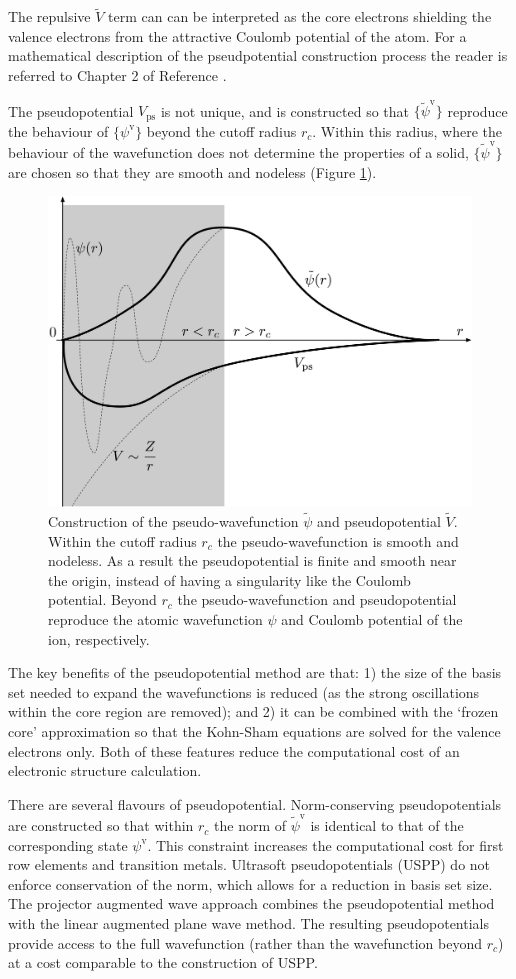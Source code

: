 The repulsive $\tilde{V}$ term can can be interpreted as the core electrons shielding the valence electrons from the attractive Coulomb potential of the atom. For a mathematical description of the pseudpotential construction process the reader is referred to Chapter 2 of Reference \cite{Kaxiras2007}.

The pseudopotential $V_\mathrm{ps}$ is not unique, and is constructed so that $\{\tilde{\psi}^\mathrm{v}\}$ reproduce the behaviour of $\{\psi^\mathrm{v}\}$ beyond the cutoff radius $r_c$. Within this radius, where the behaviour of the wavefunction does not determine the properties of a solid, $\{\tilde{\psi}^\mathrm{v}\}$ are chosen so that they are smooth and nodeless (Figure \ref{ppfigure}).

\begin{figure}[h]
\centering
  \includegraphics[width=0.6\columnwidth]{figures/ch3/ppfigure.png}
  \caption[Construction of the pseudo-wavefunction and pseudopotential]{Construction of the pseudo-wavefunction $\tilde{\psi}$ and pseudopotential $\tilde{V}$. Within the cutoff radius $r_c$ the pseudo-wavefunction is smooth and nodeless. As a result the pseudopotential is finite and smooth near the origin, instead of having a singularity like the Coulomb potential. Beyond $r_c$ the pseudo-wavefunction and pseudopotential reproduce the atomic wavefunction $\psi$ and Coulomb potential of the ion, respectively.}
  \label{ppfigure}
\end{figure}

The key benefits of the pseudopotential method are that: 1) the size of the basis set needed to expand the wavefunctions is reduced (as the strong oscillations within the core region are removed); and 2) it can be combined with the `frozen core' approximation so that the Kohn-Sham equations are solved for the valence electrons only. Both of these features reduce the computational cost of an electronic structure calculation.

There are several flavours of pseudopotential. Norm-conserving pseudopotentials are constructed so that within $r_c$ the norm of $\tilde{\psi}^\mathrm{v}$ is identical to that of the corresponding state $\psi^\mathrm{v}$. This constraint increases the computational cost for first row elements and transition metals. Ultrasoft pseudopotentials (USPP) do not enforce conservation of the norm, which allows for a reduction in basis set size. The projector augmented wave approach combines the pseudopotential method with the linear augmented plane wave method.\autocite{Blochl1994} The resulting pseudopotentials provide access to the full wavefunction (rather than the wavefunction beyond $r_c$) at a cost comparable to the construction of USPP.


